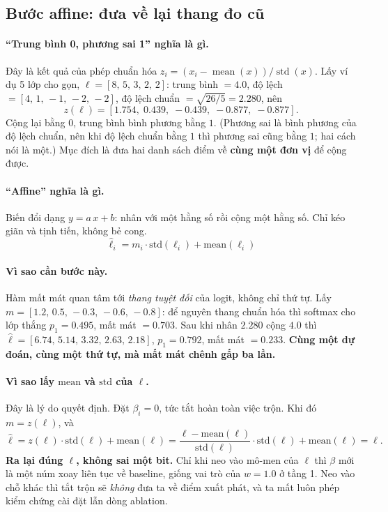 \documentclass[11pt,a4paper]{article}
\begin{document}
\subsection{Bước affine: đưa về lại thang đo cũ}
\label{sec:affine}

\paragraph{``Trung bình 0, phương sai 1'' nghĩa là gì.}
Đây là kết quả của phép chuẩn hóa $z_i = (x_i - \operatorname{mean}(x)) /
\operatorname{std}(x)$. Lấy ví dụ 5 lớp cho gọn, $\ell = [8,\, 5,\, 3,\, 2,\, 2]$:
trung bình $= 4.0$, độ lệch $= [4,\, 1,\, -1,\, -2,\, -2]$, độ lệch chuẩn
$= \sqrt{26/5} = 2.280$, nên
\[ z(\ell) = [1.754,\; 0.439,\; -0.439,\; -0.877,\; -0.877] . \]
Cộng lại bằng $0$, trung bình bình phương bằng $1$. (Phương sai là bình phương
của độ lệch chuẩn, nên khi độ lệch chuẩn bằng $1$ thì phương sai cũng bằng $1$;
hai cách nói là một.) Mục đích là đưa hai danh sách điểm về \textbf{cùng một đơn
vị} để cộng được.

\paragraph{``Affine'' nghĩa là gì.}
Biến đổi dạng $y = a\,x + b$: nhân với một hằng số rồi cộng một hằng số. Chỉ kéo
giãn và tịnh tiến, không bẻ cong.
\begin{equation}
\hat{\ell}_i = m_i \cdot \mathrm{std}(\ell_i) + \mathrm{mean}(\ell_i)
\label{eq:affine}
\end{equation}

\paragraph{Vì sao cần bước này.}
Hàm mất mát quan tâm tới \emph{thang tuyệt đối} của logit, không chỉ thứ tự. Lấy
$m = [1.2,\, 0.5,\, -0.3,\, -0.6,\, -0.8]$: để nguyên thang chuẩn hóa thì softmax
cho lớp thắng $p_1 = 0.495$, mất mát $= 0.703$. Sau khi nhân $2.280$ cộng $4.0$
thì $\hat\ell = [6.74,\, 5.14,\, 3.32,\, 2.63,\, 2.18]$, $p_1 = 0.792$, mất mát
$= \mathbf{0.233}$. \textbf{Cùng một dự đoán, cùng một thứ tự, mà mất mát chênh
gấp ba lần.}

\paragraph{Vì sao lấy $\mathrm{mean}$ và $\mathrm{std}$ của $\ell$.}
Đây là lý do quyết định. Đặt $\beta_i = 0$, tức tắt hoàn toàn việc trộn. Khi đó
$m = z(\ell)$, và
\[ \hat{\ell} = z(\ell)\cdot \mathrm{std}(\ell) + \mathrm{mean}(\ell)
   = \frac{\ell - \mathrm{mean}(\ell)}{\mathrm{std}(\ell)}\cdot \mathrm{std}(\ell)
     + \mathrm{mean}(\ell) = \ell . \]
\textbf{Ra lại đúng $\ell$, không sai một bit.} Chỉ khi neo vào mô-men của $\ell$
thì $\beta$ mới là một núm xoay liên tục về baseline, giống vai trò của $w = 1.0$
ở tầng 1. Neo vào chỗ khác thì tắt trộn sẽ \emph{không} đưa ta về điểm xuất phát,
và ta mất luôn phép kiểm chứng cài đặt lẫn dòng ablation.
\end{document}
